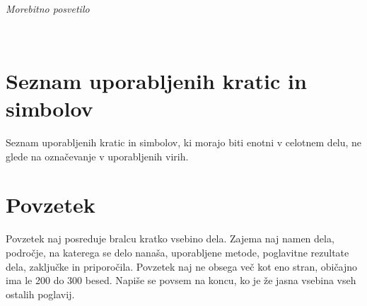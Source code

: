 \documentclass[12pt,a4paper,openany]{book}
\begin{document}
\ \thispagestyle{empty}

\newpage


\thispagestyle{empty}

$\;$ 

\vspace{5cm}
\hfill {\Large \em Morebitno posvetilo}
\thispagestyle{empty}

\newpage



\ \thispagestyle{empty}

\newpage


\renewcommand\thepage{} 
\tableofcontents 
\renewcommand\thepage{\arabic{page}}

\thispagestyle{empty}



\chapter*{Seznam uporabljenih kratic in simbolov}

\thispagestyle{empty}

Seznam uporabljenih kratic in simbolov, ki morajo biti enotni v celotnem delu, ne glede na označevanje v uporabljenih virih.


\clearpage{\pagestyle{empty}\cleardoublepage}


\setcounter{page}{1}

\chapter*{Povzetek}


Povzetek naj posreduje bralcu kratko vsebino dela. Zajema naj namen dela, področje, na katerega se delo nanaša,
uporabljene metode, poglavitne rezultate dela, zaključke in priporočila. 
Povzetek naj ne obsega več kot eno stran, obi\v cajno ima le 200 do 300 besed. Napiše se povsem na koncu,
ko je že jasna vsebina vseh ostalih poglavij.
\end{document}
